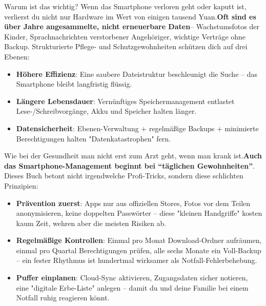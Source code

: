 \begin{tcbinfo}{Warum ist das wichtig?}
Wenn das Smartphone verloren geht oder kaputt ist, verlierst du nicht nur Hardware im Wert von einigen tausend Yuan.\textbf{Oft sind es über Jahre angesammelte, nicht erneuerbare Daten}– Wachstumsfotos der Kinder, Sprachnachrichten verstorbener Angehöriger, wichtige Verträge ohne Backup. Strukturierte Pflege- und Schutzgewohnheiten schützen dich auf drei Ebenen:

\begin{itemize}
  \item \textbf{Höhere Effizienz}: Eine saubere Dateistruktur beschleunigt die Suche – das Smartphone bleibt langfristig flüssig.
  \item \textbf{Längere Lebensdauer}: Vernünftiges Speichermanagement entlastet Lese-/Schreibvorgänge, Akku und Speicher halten länger.
  \item \textbf{Datensicherheit}: Ebenen-Verwaltung + regelmäßige Backups + minimierte Berechtigungen halten "Datenkatastrophen" fern.
\end{itemize}

\end{tcbinfo}


Wie bei der Gesundheit man nicht erst zum Arzt geht, wenn man krank ist.\textbf{Auch das Smartphone-Management beginnt bei “täglichen Gewohnheiten”}. Dieses Buch betont nicht irgendwelche Profi-Tricks, sondern diese schlichten Prinzipien:

\begin{itemize}
  \item \textbf{Prävention zuerst}: Apps nur aus offiziellen Stores, Fotos vor dem Teilen anonymisieren, keine doppelten Passwörter – diese "kleinen Handgriffe" kosten kaum Zeit, wehren aber die meisten Risiken ab.
  \item \textbf{Regelmäßige Kontrollen}: Einmal pro Monat Download-Ordner aufräumen, einmal pro Quartal Berechtigungen prüfen, alle sechs Monate ein Voll-Backup – ein fester Rhythmus ist hundertmal wirksamer als Notfall-Fehlerbehebung.
  \item \textbf{Puffer einplanen}: Cloud-Sync aktivieren, Zugangsdaten sicher notieren, eine "digitale Erbe-Liste" anlegen – damit du und deine Familie bei einem Notfall ruhig reagieren könnt.
\end{itemize}
